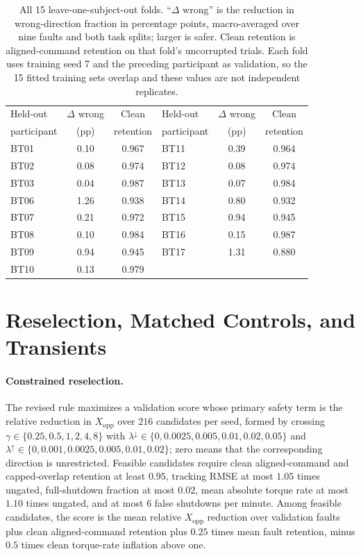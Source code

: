 \documentclass[letterpaper]{article}
\begin{document}
\begin{table}[t]
\centering
\scriptsize
\setlength{\tabcolsep}{4.2pt}
\begin{tabular}{@{}lcc@{\hskip 14pt}lcc@{}}
\toprule
Held-out & $\Delta$ wrong & Clean & Held-out & $\Delta$ wrong & Clean\\
participant & (pp) & retention & participant & (pp) & retention\\
\midrule
BT01 & 0.10 & 0.967 & BT11 & 0.39 & 0.964\\
BT02 & 0.08 & 0.974 & BT12 & 0.08 & 0.974\\
BT03 & 0.04 & 0.987 & BT13 & 0.07 & 0.984\\
BT06 & 1.26 & 0.938 & BT14 & 0.80 & 0.932\\
BT07 & 0.21 & 0.972 & BT15 & 0.94 & 0.945\\
BT08 & 0.10 & 0.984 & BT16 & 0.15 & 0.987\\
BT09 & 0.94 & 0.945 & BT17 & 1.31 & 0.880\\
BT10 & 0.13 & 0.979 & & & \\
\bottomrule
\end{tabular}
\caption{All 15 leave-one-subject-out folds. ``$\Delta$ wrong'' is the reduction
in wrong-direction fraction in percentage points, macro-averaged over nine
faults and both task splits; larger is safer. Clean retention is
aligned-command retention on that fold's uncorrupted trials. Each fold uses
training seed 7 and the preceding participant as validation, so the 15 fitted
training sets overlap and these values are not independent replicates.}
\label{tab:loso-folds}
\end{table}

\section{Reselection, Matched Controls, and Transients}

\paragraph{Constrained reselection.}
The revised rule maximizes a validation score whose primary safety term is the
relative reduction in $X_{\mathrm{opp}}$ over $216$ candidates per seed, formed
by crossing $\gamma\in\{0.25,0.5,1,2,4,8\}$ with
$\lambda^{\downarrow}\in\{0,0.0025,0.005,0.01,0.02,0.05\}$ and
$\lambda^{\uparrow}\in\{0,0.001,0.0025,0.005,0.01,0.02\}$; zero means that the
corresponding direction is unrestricted. Feasible candidates require clean
aligned-command and capped-overlap retention at least $0.95$, tracking RMSE at
most $1.05$ times ungated, full-shutdown fraction at most $0.02$, mean absolute
torque rate at most $1.10$ times ungated, and at most $6$ false shutdowns per
minute. Among feasible candidates, the score is the mean relative
$X_{\mathrm{opp}}$ reduction over validation faults plus clean aligned-command
retention plus $0.25$ times mean fault retention, minus $0.5$ times clean
torque-rate inflation above one.
\end{document}
